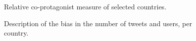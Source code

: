 \begin{figure}[t]
\centering
{}%
\caption{Relative co-protagonist measure of selected countries.}\label{fig:coprotagonism-ind}
\end{figure}

\begin{figure}[t]
\centering
{}%
\caption{Description of the bias in the number of tweets and users, per country.}\label{fig:tweets-per}
\end{figure}



